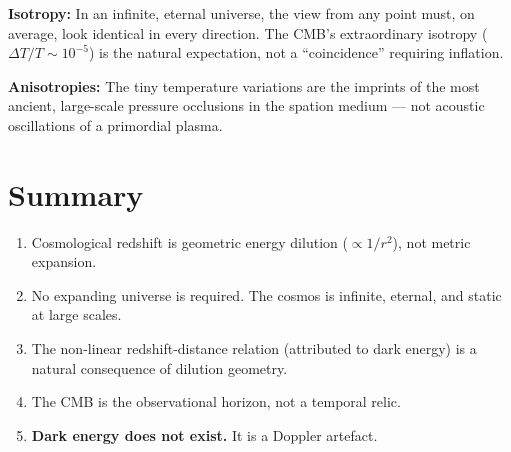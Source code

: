 \textbf{Isotropy:} In an infinite, eternal universe, the view from any point must, on average, look identical in every direction.  The CMB's extraordinary isotropy ($\Delta T/T \sim 10^{-5}$) is the natural expectation, not a ``coincidence'' requiring inflation.

\textbf{Anisotropies:} The tiny temperature variations are the imprints of the most ancient, large-scale pressure occlusions in the spation medium --- not acoustic oscillations of a primordial plasma.


\section{Summary}

\begin{enumerate}
  \item Cosmological redshift is geometric energy dilution ($\propto 1/r^2$), not metric expansion.
  \item No expanding universe is required.  The cosmos is infinite, eternal, and static at large scales.
  \item The non-linear redshift-distance relation (attributed to dark energy) is a natural consequence of dilution geometry.
  \item The CMB is the observational horizon, not a temporal relic.
  \item \textbf{Dark energy does not exist.}  It is a Doppler artefact.
\end{enumerate}
